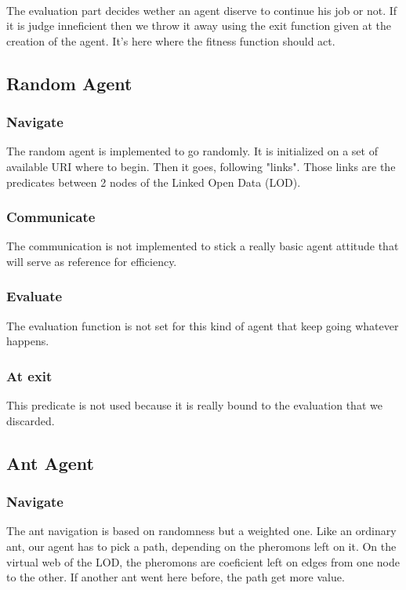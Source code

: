 \documentclass{article}
\begin{document}
	\paragraph{}
		The evaluation part decides wether an agent diserve to continue his job or not.
		If it is judge inneficient then we throw it away using the exit function given at the creation of the agent.
		It's here where the fitness function should act.
	\subsection{Random Agent}
		\subsubsection{Navigate}
			The random agent is implemented to go randomly.
			It is initialized on a set of available URI where to begin.
			Then it goes, following "links".
			Those links are the predicates between 2 nodes of the Linked Open Data (LOD).
		\subsubsection{Communicate}
			The communication is not implemented to stick a really basic agent attitude that will serve as reference for efficiency.
		\subsubsection{Evaluate}
			The evaluation function is not set for this kind of agent that keep going whatever happens.
		\subsubsection{At exit}
			This predicate is not used because it is really bound to the evaluation that we discarded.
	\subsection{Ant Agent}
		\subsubsection{Navigate}
			The ant navigation is based on randomness but a weighted one.
			Like an ordinary ant, our agent has to pick a path, depending on the pheromons left on it.
			On the virtual web of the LOD, the pheromons are coeficient left on edges from one node to the other.
			If another ant went here before, the path get more value.			
\end{document}
